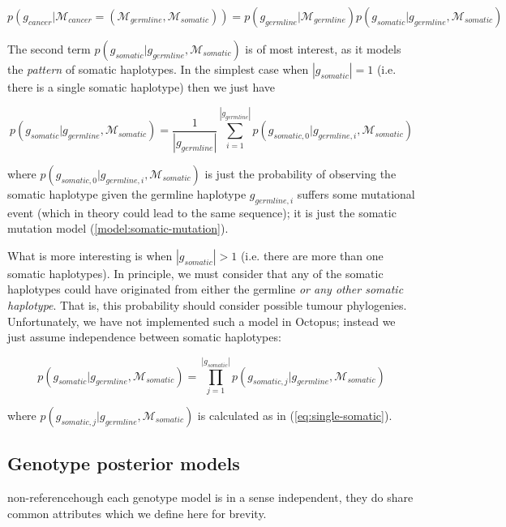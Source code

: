 \documentclass{article}
\begin{document}
\begin{equation}
 p(g_{cancer} | \mathcal{M}_{cancer} = (\mathcal{M}_{germline}, \mathcal{M}_{somatic})) = p(g_{germline} | \mathcal{M}_{germline}) p(g_{somatic} | g_{germline}, \mathcal{M}_{somatic})
\end{equation}

The second term $p(g_{somatic} | g_{germline}, \mathcal{M}_{somatic})$ is of most interest, as it models the \emph{pattern} of somatic haplotypes. In the simplest case when $|g_{somatic}| = 1$ (i.e. there is a single somatic haplotype) then we just have

\begin{equation}
	\label{eq:single-somatic}
	p(g_{somatic} | g_{germline}, \mathcal{M}_{somatic}) = \frac{1}{|g_{germline}|} \sum_{i = 1}^{|g_{germline}|} p(g_{somatic,0} | g_{germline, i}, \mathcal{M}_{somatic})
\end{equation}

where $p(g_{somatic,0} | g_{germline, i}, \mathcal{M}_{somatic})$ is just the probability of observing the somatic haplotype given the germline haplotype $g_{germline, i}$ suffers some mutational event (which in theory could lead to the same sequence); it is just the somatic mutation model (\ref{model:somatic-mutation}).

What is more interesting is when $|g_{somatic}| > 1$ (i.e. there are more than one somatic haplotypes). In principle, we must consider that any of the somatic haplotypes could have originated from either the germline \emph{or any other somatic haplotype}. That is, this probability should consider possible tumour phylogenies. Unfortunately, we have not implemented such a model in Octopus; instead we just assume independence between somatic haplotypes:

\begin{equation}
p(g_{somatic} | g_{germline}, \mathcal{M}_{somatic}) = \prod_{j = 1}^{|g_{somatic}|} p(g_{somatic,j} | g_{germline}, \mathcal{M}_{somatic})
\end{equation}

where $p(g_{somatic,j} | g_{germline}, \mathcal{M}_{somatic})$ is calculated as in (\ref{eq:single-somatic}).

\subsection{Genotype posterior models}\label{model:genotype-posterior}

non-referencehough each genotype model is in a sense independent, they do share common attributes which we define here for brevity.
\end{document}
